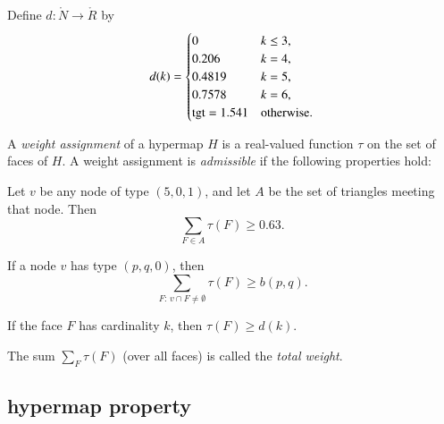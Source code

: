 \begin{definition}[d]
    Define $d:\ring{N}\to \ring{R}$ by
  $$d(k) = \begin{cases}
    0 & k\le3, \\
    0.206 & k=4, \\
    0.4819 & k=5, \\
    0.7578 & k=6, \\
    {\operatorname{tgt}}=1.541 & \text{otherwise}.
  \end{cases}
  $$
%
\end{definition}




\begin{definition}
%
A {\it weight assignment\/} of a hypermap $H$ is a real-valued function $\tau$ on
the set of faces of $H$. A weight assignment is {\it admissible} if the
following properties hold:
%
\begin{nomerate}
 \item {} Let $v$ be any node of type $(5,0,1)$, and let $A$ be the set of
triangles meeting that node.
        Then
        $$\sum_{F\in A} \tau(F)
            \ge  0.63.$$
 \item {} If a node $v$ has type $(p,q,0)$, then
        $$\sum_{F:\,v\cap F\ne\emptyset} \tau(F) \ge b(p,q).$$
  \item {} If the face $F$ has cardinality $k$, then
        $\tau(F) \ge d(k)$.
\end{nomerate}
%
%

The sum $\sum_F \tau(F)$ (over all faces) is called the {\it total weight}. %
%
\end{definition}





\subsection{hypermap property}
\label{sec:graphproperty}

